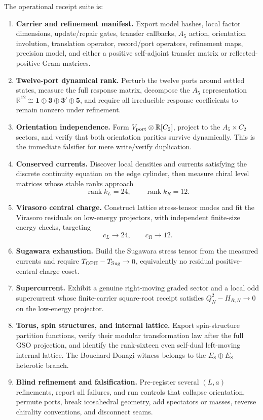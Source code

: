 \documentclass[11pt]{article}
\theoremstyle{remark}
\theoremstyle{plain}
\newcommand{\OPH}{\mathrm{OPH}}
\begin{document}
The operational receipt suite is:
\begin{enumerate}[leftmargin=2em,label=\textbf{FC-\arabic*.}]
\item \textbf{Carrier and refinement manifest.} Export model hashes, local factor dimensions,
update/repair gates, transfer callbacks, \(A_5\) action, orientation involution, translation
operator, record/port operators, refinement maps, precision model, and either a positive
self-adjoint transfer matrix or reflected-positive Gram matrices.
\item \textbf{Twelve-port dynamical rank.} Perturb the twelve ports around settled states, measure
the full response matrix, decompose the \(A_5\) representation
\(\mathbb R^{12}\cong\mathbf1\oplus\mathbf3\oplus\mathbf3'\oplus\mathbf5\), and require all
irreducible response coefficients to remain nonzero under refinement.
\item \textbf{Orientation independence.} Form
\(V_{\rm port}\otimes\mathbb R[C_2]\), project to the \(A_5\times C_2\) sectors, and verify that
both orientation parities survive dynamically. This is the immediate falsifier for mere
write/verify duplication.
\item \textbf{Conserved currents.} Discover local densities and currents satisfying the discrete
continuity equation on the edge cylinder, then measure chiral level matrices whose stable ranks
approach
\[
\operatorname{rank}k_L=24,\qquad \operatorname{rank}k_R=12.
\]
\item \textbf{Virasoro central charge.} Construct lattice stress-tensor modes and fit the
Virasoro residuals on low-energy projectors, with independent finite-size energy checks, targeting
\[
c_L\to24,\qquad c_R\to12.
\]
\item \textbf{Sugawara exhaustion.} Build the Sugawara stress tensor from the measured currents
and require \(T_{\OPH}-T_{\rm Sug}\to0\), equivalently no residual positive-central-charge coset.
\item \textbf{Supercurrent.} Exhibit a genuine right-moving graded sector and a local odd
supercurrent whose finite-carrier square-root receipt satisfies \(Q_N^2-H_{R,N}\to0\) on the
low-energy projector.
\item \textbf{Torus, spin structures, and internal lattice.} Export spin-structure partition
functions, verify their modular transformation law after the full GSO projection, and identify the
rank-sixteen even self-dual left-moving internal lattice. The Bouchard-Donagi witness belongs to
the \(E_8\oplus E_8\) heterotic branch.
\item \textbf{Blind refinement and falsification.} Pre-register several \((L,a)\) refinements,
report all failures, and run controls that collapse orientation, permute ports, break icosahedral
geometry, add spectators or masses, reverse chirality conventions, and disconnect seams.
\end{enumerate}
\end{document}
